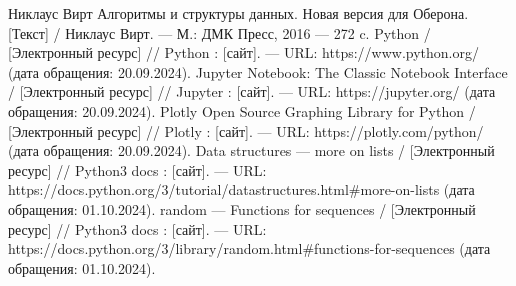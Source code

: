 \begin{thebibliography}{}
	 Никлаус Вирт Алгоритмы и структуры данных. Новая версия для Оберона. [Текст] / Никлаус Вирт. — М.: ДМК Пресс, 2016 — 272 c.
	  Python /  [Электронный ресурс] // Python : [сайт]. — URL: https://www.python.org/ (дата обращения: 20.09.2024).
	  Jupyter Notebook: The Classic Notebook Interface /  [Электронный ресурс] // Jupyter : [сайт]. — URL: https://jupyter.org/ (дата обращения: 20.09.2024).
	  Plotly Open Source Graphing Library for Python /  [Электронный ресурс] // Plotly : [сайт]. — URL: https://plotly.com/python/ (дата обращения: 20.09.2024).
	  Data structures — more on lists /  [Электронный ресурс] // Python3 docs : [сайт]. — URL: https://docs.python.org/3/tutorial/datastructures.html\#more-on-lists (дата обращения: 01.10.2024).
	  random — Functions for sequences /  [Электронный ресурс] // Python3 docs : [сайт]. — URL: https://docs.python.org/3/library/random.html\#functions-for-sequences (дата обращения: 01.10.2024).
\end{thebibliography}
